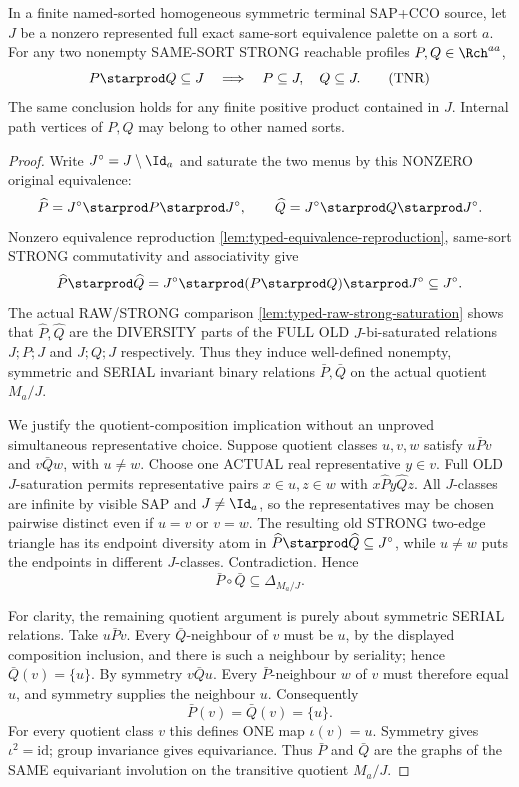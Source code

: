 \begin{lemma}
\label{lem:typed-terminal-no-return}
In a finite named-sorted homogeneous symmetric
terminal SAP+CCO source, let $J$ be a nonzero
represented full exact same-sort equivalence
palette on a sort $a$. For any two nonempty
SAME-SORT STRONG reachable profiles
$P,Q\in\Rch^{aa}$,
\[
       P\starprod Q\subseteq J
          \quad\Longrightarrow\quad
       P\subseteq J,\quad Q\subseteq J.
 \tag{TNR}\label{eq:typed-no-return}
\]
The same conclusion holds for any finite positive
product contained in $J$. Internal path vertices
of $P,Q$ may belong to other named sorts.
\end{lemma}
\begin{proof}
Write $J^\circ=J\setminus\Id_a$ and saturate the
two menus by this NONZERO original equivalence:
\[
 \widehat P=J^\circ\starprod P\starprod J^\circ,
 \qquad
 \widehat Q=J^\circ\starprod Q\starprod J^\circ.
\]
Nonzero equivalence reproduction
\cref{lem:typed-equivalence-reproduction},
same-sort STRONG commutativity and associativity
give
\[
 \widehat P\starprod\widehat Q
 =J^\circ\starprod(P\starprod Q)\starprod J^\circ
 \subseteq J^\circ.
\]
The actual RAW/STRONG comparison
\cref{lem:typed-raw-strong-saturation}
shows that $\widehat P,\widehat Q$ are
the DIVERSITY parts of the FULL OLD
$J$-bi-saturated relations $J;P;J$ and
$J;Q;J$ respectively. Thus they induce
well-defined nonempty, symmetric and SERIAL
invariant binary relations $\bar P,\bar Q$
on the actual quotient $M_a/J$.

We justify the quotient-composition implication
without an unproved simultaneous representative
choice. Suppose quotient classes $u,v,w$ satisfy
$u\bar P v$ and $v\bar Q w$, with $u\ne w$.
Choose one ACTUAL real representative $y\in v$.
Full OLD $J$-saturation permits representative
pairs $x\in u,z\in w$ with
$x\widehat P y\widehat Q z$.
All $J$-classes are infinite by visible SAP
and $J\ne\Id_a$, so the representatives may
be chosen pairwise distinct even if $u=v$
or $v=w$. The resulting old STRONG
two-edge triangle has its endpoint diversity
atom in $\widehat P\starprod\widehat Q
\subseteq J^\circ$, while $u\ne w$ puts
the endpoints in different $J$-classes.
Contradiction. Hence
\[
                \bar P\circ\bar Q\subseteq\Delta_{M_a/J}.
\]

For clarity, the remaining quotient argument
is purely about symmetric SERIAL relations.
Take $u\bar P v$. Every $\bar Q$-neighbour
of $v$ must be $u$, by the displayed
composition inclusion, and there is such
a neighbour by seriality; hence
$\bar Q(v)=\{u\}$. By symmetry
$v\bar Q u$. Every $\bar P$-neighbour
$w$ of $v$ must therefore equal $u$,
and symmetry supplies the neighbour $u$.
Consequently
\[
                 \bar P(v)=\bar Q(v)=\{u\}.
\]
For every quotient class $v$ this defines
ONE map $\iota(v)=u$. Symmetry gives
$\iota^2=\mathrm{id}$; group invariance gives
equivariance. Thus $\bar P$ and $\bar Q$
are the graphs of the SAME equivariant
involution on the transitive quotient $M_a/J$.


\end{proof}
